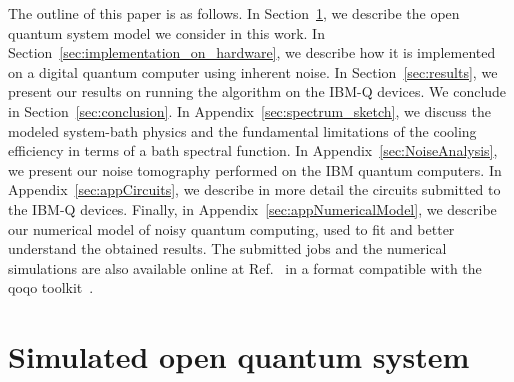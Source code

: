\documentclass[twocolumn,amsmath,amssymb,pra]{revtex4-2}
\begin{document}
The outline of this paper is as follows.
In Section~\ref{sec:system_bath},
we describe the open quantum system model we consider in this work. 
In Section~\ref{sec:implementation_on_hardware},
we describe how it is implemented on a digital quantum computer using inherent noise.
In Section~\ref{sec:results}, we present our results on running the algorithm on the IBM-Q devices.
We conclude in Section~\ref{sec:conclusion}.
In Appendix~\ref{sec:spectrum_sketch},
we discuss the modeled system-bath physics and the fundamental limitations of the cooling efficiency in terms of a bath spectral function.
In Appendix~\ref{sec:NoiseAnalysis}, we present our noise tomography performed on the IBM quantum computers.
In Appendix~\ref{sec:appCircuits}, we describe in more detail the circuits submitted to the IBM-Q devices.
Finally, in Appendix~\ref{sec:appNumericalModel},
we describe our numerical model of noisy quantum computing,
used to fit and better understand the obtained results.
The submitted jobs and the numerical simulations are also available online at Ref.~\cite{qoqo_files_online}
in a format compatible with the qoqo toolkit~\cite{qoqo}.















\section{Simulated open quantum system}
\label{sec:system_bath}
\end{document}
